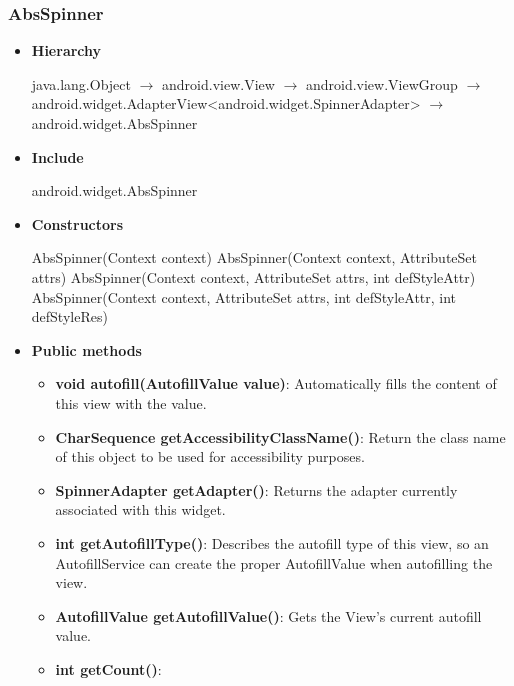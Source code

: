 \documentclass{report}
\begin{document}
    \subsubsection{AbsSpinner}
    \begin{itemize}
         \item \textbf{Hierarchy} 
            \bigbreak \noindent 
            \begin{center}
                java.lang.Object $\to$	android.view.View $\to$	android.view.ViewGroup $\to$	android.widget.AdapterView<android.widget.SpinnerAdapter> $\to$	android.widget.AbsSpinner 
            \end{center}
        \item \textbf{Include}
            \bigbreak \noindent 
            \begin{javacode}
                android.widget.AbsSpinner 
            \end{javacode}
        \item \textbf{Constructors}
            \bigbreak \noindent 
            \begin{javacode}
                AbsSpinner(Context context)
                AbsSpinner(Context context, AttributeSet attrs)
                AbsSpinner(Context context, AttributeSet attrs, int defStyleAttr)
                AbsSpinner(Context context, AttributeSet attrs, int defStyleAttr, int defStyleRes)
            \end{javacode}
        \item \textbf{Public methods}
            \begin{itemize}
                \item \textbf{void	autofill(AutofillValue value)}: Automatically fills the content of this view with the value.
                \item \textbf{CharSequence	getAccessibilityClassName()}: Return the class name of this object to be used for accessibility purposes.
                \item \textbf{SpinnerAdapter	getAdapter()}: Returns the adapter currently associated with this widget.
                \item \textbf{int	getAutofillType()}: Describes the autofill type of this view, so an AutofillService can create the proper AutofillValue when autofilling the view.
                \item \textbf{AutofillValue	getAutofillValue()}: Gets the View's current autofill value.
                \item \textbf{int	getCount()}:

\end{itemize}
\end{itemize}
\end{document}
